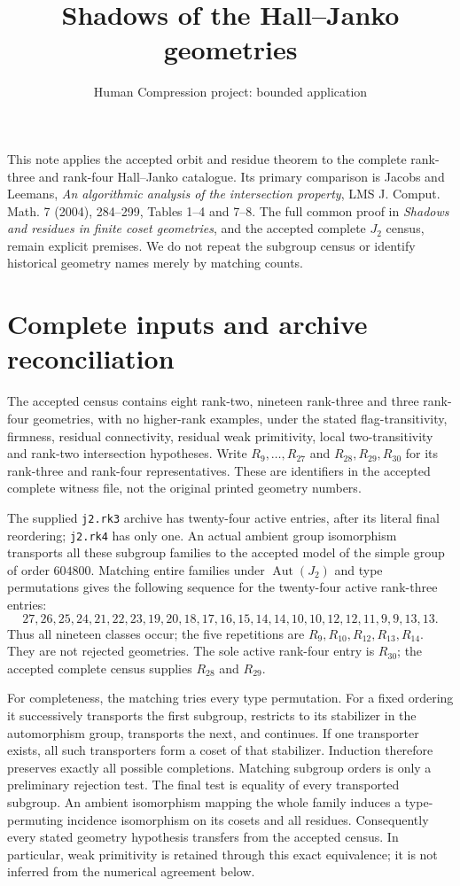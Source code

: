 \documentclass[11pt,a4paper]{article}
\title{Shadows of the Hall--Janko geometries}
\author{Human Compression project: bounded application}\date{}
\begin{document}
\maketitle
This note applies the accepted orbit and residue theorem to the complete
rank-three and rank-four Hall--Janko catalogue. Its primary comparison is
Jacobs and Leemans, \emph{An algorithmic analysis of the intersection
property}, LMS J. Comput. Math. 7 (2004), 284--299, Tables 1--4 and 7--8.
The full common proof in \emph{Shadows and residues in finite coset
geometries}, and the accepted complete $J_2$ census, remain explicit
premises. We do not repeat the subgroup census or identify historical
geometry names merely by matching counts.

\section{Complete inputs and archive reconciliation}
The accepted census contains eight rank-two, nineteen rank-three and
three rank-four geometries, with no higher-rank examples, under the
stated flag-transitivity, firmness, residual connectivity, residual weak
primitivity, local two-transitivity and rank-two intersection hypotheses.
Write $R_9,\ldots,R_{27}$ and $R_{28},R_{29},R_{30}$ for its rank-three and
rank-four representatives. These are identifiers in the accepted complete
witness file, not the original printed geometry numbers.

The supplied \texttt{j2.rk3} archive has twenty-four active entries, after
its literal final reordering; \texttt{j2.rk4} has only one. An actual ambient
group isomorphism transports all these subgroup families to the accepted
model of the simple group of order $604800$. Matching entire families
under $\operatorname{Aut}(J_2)$ and type permutations gives the following
sequence for the twenty-four active rank-three entries:
\[
27,26,25,24,21,22,23,19,20,18,17,16,15,14,14,10,10,12,12,11,9,9,13,13.
\]
Thus all nineteen classes occur; the five repetitions are $R_9,R_{10},
R_{12},R_{13},R_{14}$. They are not rejected geometries. The sole active
rank-four entry is $R_{30}$; the accepted complete census supplies
$R_{28}$ and $R_{29}$.

For completeness, the matching tries every type permutation. For a fixed
ordering it successively transports the first subgroup, restricts to its
stabilizer in the automorphism group, transports the next, and continues.
If one transporter exists, all such transporters form a coset of that
stabilizer. Induction therefore preserves exactly all possible completions.
Matching subgroup orders is only a preliminary rejection test. The final
test is equality of every transported subgroup. An ambient isomorphism
mapping the whole family induces a type-permuting incidence isomorphism
on its cosets and all residues. Consequently every stated geometry
hypothesis transfers from the accepted census. In particular, weak
primitivity is retained through this exact equivalence; it is not inferred
from the numerical agreement below.
\end{document}
